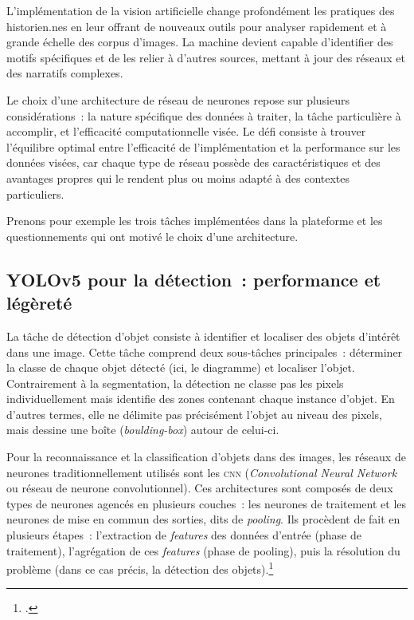 L'implémentation de la vision artificielle change profondément les
pratiques des historien.nes en leur offrant de nouveaux outils pour
analyser rapidement et à grande échelle des corpus d'images. La machine
devient capable d'identifier des motifs spécifiques et de les relier à
d'autres sources, mettant à jour des réseaux et des narratifs complexes.

Le choix d'une architecture de réseau de neurones repose sur plusieurs
considérations~: la nature spécifique des données à traiter, la tâche
particulière à accomplir, et l'efficacité computationnelle visée. Le
défi consiste à trouver l'équilibre optimal entre l'efficacité de
l'implémentation et la performance sur les données visées, car chaque
type de réseau possède des caractéristiques et des avantages propres qui
le rendent plus ou moins adapté à des contextes particuliers.

Prenons pour exemple les trois tâches implémentées dans la plateforme
\eida et les questionnements qui ont motivé le choix d'une architecture.

\hypertarget{detection}{%
\subsection{YOLOv5 pour la détection~: performance et
légèreté}\label{detection}}

La tâche de détection d'objet consiste à identifier et localiser des
objets d'intérêt dans une image. Cette tâche comprend deux sous-tâches
principales~: déterminer la classe de chaque objet détecté (ici, le
diagramme) et localiser l'objet. Contrairement à la segmentation, la
détection ne classe pas les pixels individuellement mais identifie des
zones contenant chaque instance d'objet. En d'autres termes, elle ne
délimite pas précisément l'objet au niveau des pixels, mais dessine une
boîte (\emph{boulding-box}) autour de celui-ci.

Pour la reconnaissance et la classification d'objets dans des images,
les réseaux de neurones traditionnellement utilisés sont les \textsc{cnn}
(\emph{Convolutional Neural Network} ou réseau de neurone
convolutionnel). Ces architectures sont composés de deux types de
neurones agencés en plusieurs couches~: les neurones de traitement et
les neurones de mise en commun des sorties, dits de \textit{pooling}. Ils
procèdent de fait en plusieurs étapes~: l'extraction de \emph{features}
des données d'entrée (phase de traitement), l'agrégation de ces
\emph{features} (phase de pooling), puis la résolution du problème (dans
ce cas précis, la détection des objets).\footcite[p.680-681]{indolia_conceptual_2018}

